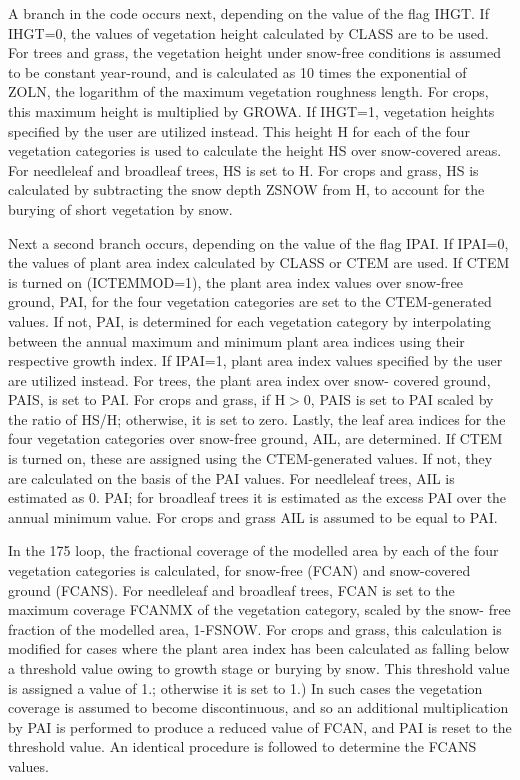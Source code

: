 A branch in the code occurs next, depending on the value of the flag I\+H\+G\+T. If I\+H\+G\+T=0, the values of vegetation height calculated by C\+L\+A\+S\+S are to be used. For trees and grass, the vegetation height under snow-\/free conditions is assumed to be constant year-\/round, and is calculated as 10 times the exponential of Z\+O\+L\+N, the logarithm of the maximum vegetation roughness length. For crops, this maximum height is multiplied by G\+R\+O\+W\+A. If I\+H\+G\+T=1, vegetation heights specified by the user are utilized instead. This height H for each of the four vegetation categories is used to calculate the height H\+S over snow-\/covered areas. For needleleaf and broadleaf trees, H\+S is set to H. For crops and grass, H\+S is calculated by subtracting the snow depth Z\+S\+N\+O\+W from H, to account for the burying of short vegetation by snow.

Next a second branch occurs, depending on the value of the flag I\+P\+A\+I. If I\+P\+A\+I=0, the values of plant area index calculated by C\+L\+A\+S\+S or C\+T\+E\+M are used. If C\+T\+E\+M is turned on (I\+C\+T\+E\+M\+M\+O\+D=1), the plant area index values over snow-\/free ground, P\+A\+I, for the four vegetation categories are set to the C\+T\+E\+M-\/generated values. If not, P\+A\+I, is determined for each vegetation category by interpolating between the annual maximum and minimum plant area indices using their respective growth index. If I\+P\+A\+I=1, plant area index values specified by the user are utilized instead. For trees, the plant area index over snow-\/ covered ground, P\+A\+I\+S, is set to P\+A\+I. For crops and grass, if H$>$0, P\+A\+I\+S is set to P\+A\+I scaled by the ratio of H\+S/\+H; otherwise, it is set to zero. Lastly, the leaf area indices for the four vegetation categories over snow-\/free ground, A\+I\+L, are determined. If C\+T\+E\+M is turned on, these are assigned using the C\+T\+E\+M-\/generated values. If not, they are calculated on the basis of the P\+A\+I values. For needleleaf trees, A\+I\+L is estimated as 0. P\+A\+I; for broadleaf trees it is estimated as the excess P\+A\+I over the annual minimum value. For crops and grass A\+I\+L is assumed to be equal to P\+A\+I.

In the 175 loop, the fractional coverage of the modelled area by each of the four vegetation categories is calculated, for snow-\/free (F\+C\+A\+N) and snow-\/covered ground (F\+C\+A\+N\+S). For needleleaf and broadleaf trees, F\+C\+A\+N is set to the maximum coverage F\+C\+A\+N\+M\+X of the vegetation category, scaled by the snow-\/ free fraction of the modelled area, 1-\/\+F\+S\+N\+O\+W. For crops and grass, this calculation is modified for cases where the plant area index has been calculated as falling below a threshold value owing to growth stage or burying by snow. This threshold value is assigned a value of 1.; otherwise it is set to 1.) In such cases the vegetation coverage is assumed to become discontinuous, and so an additional multiplication by P\+A\+I is performed to produce a reduced value of F\+C\+A\+N, and P\+A\+I is reset to the threshold value. An identical procedure is followed to determine the F\+C\+A\+N\+S values.

